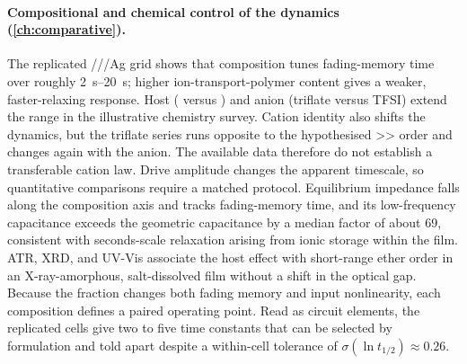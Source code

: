 \documentclass[12pt, twoside]{report}
\begin{document}
\paragraph{Compositional and chemical control of the dynamics (\cref{ch:comparative}).} The replicated \SY{}/\PEO{}/\LiTf{}/Ag grid shows that composition tunes fading-memory time over roughly \SIrange{2}{20}{\second}; higher ion-transport-polymer content gives a weaker, faster-relaxing response. Host (\PEO{} versus \TMPE{}) and anion (triflate versus TFSI) extend the range in the illustrative chemistry survey. Cation identity also shifts the dynamics, but the triflate series runs opposite to the hypothesised >> order and changes again with the anion. The available data therefore do not establish a transferable cation law. Drive amplitude changes the apparent timescale, so quantitative comparisons require a matched protocol. Equilibrium impedance falls along the composition axis and tracks fading-memory time, and its low-frequency capacitance exceeds the geometric capacitance by a median factor of about 69, consistent with seconds-scale relaxation arising from ionic storage within the film. ATR, XRD, and UV-Vis associate the host effect with short-range ether order in an X-ray-amorphous, salt-dissolved film without a shift in the \SY{} optical gap. Because the \PEO{} fraction changes both fading memory and input nonlinearity, each composition defines a paired operating point. Read as circuit elements, the replicated cells give two to five time constants that can be selected by formulation and told apart despite a within-cell tolerance of \(\sigma(\ln t_{1/2})\approx\num{0.26}\).
\end{document}
